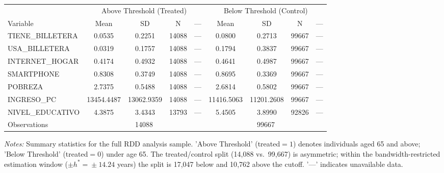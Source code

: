 \begin{threeparttable}
\begin{tabular}{l cccc cccc}
\toprule
& \multicolumn{4}{c}{Above Threshold (Treated)} & \multicolumn{4}{c}{Below Threshold (Control)} \\
\cmidrule(lr){2-5} \cmidrule(lr){6-9}
Variable & Mean & SD & N & --- & Mean & SD & N & --- \\
\midrule
  TIENE\_BILLETERA & 0.0535 & 0.2251 & 14088 & --- & 0.0800 & 0.2713 & 99667 & --- \\
  USA\_BILLETERA & 0.0319 & 0.1757 & 14088 & --- & 0.1794 & 0.3837 & 99667 & --- \\
  INTERNET\_HOGAR & 0.4174 & 0.4932 & 14088 & --- & 0.4641 & 0.4987 & 99667 & --- \\
  SMARTPHONE & 0.8308 & 0.3749 & 14088 & --- & 0.8695 & 0.3369 & 99667 & --- \\
  POBREZA & 2.7375 & 0.5488 & 14088 & --- & 2.6814 & 0.5802 & 99667 & --- \\
  INGRESO\_PC & 13454.4487 & 13062.9359 & 14088 & --- & 11416.5063 & 11201.2608 & 99667 & --- \\
  NIVEL\_EDUCATIVO & 4.3875 & 3.4343 & 13793 & --- & 5.4505 & 3.8990 & 92826 & --- \\
\midrule
  Observations & \multicolumn{4}{c}{14088} & \multicolumn{4}{c}{99667} \\
\bottomrule
\end{tabular}
\begin{tablenotes}
\small
\item \textit{Notes:} Summary statistics for the full RDD analysis sample. 'Above Threshold' (treated$=1$) denotes individuals aged 65 and above; 'Below Threshold' (treated$=0$) under age 65. The treated/control split (14{,}088 vs.\ 99{,}667) is asymmetric; within the bandwidth-restricted estimation window ($\pm h^{\ast}\!=\!\pm 14.24$ years) the split is 17{,}047 below and 10{,}762 above the cutoff. '---' indicates unavailable data.
\end{tablenotes}
\end{threeparttable}